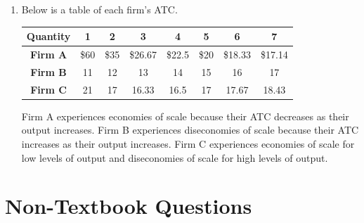 \documentclass{article}
\begin{document}
\begin{enumerate}
\begin{enumerate}
	\end{enumerate}
	
\item Below is a table of each firm's ATC.

	\begin{center}
	\begin{tabular}{| c | c | c | c | c | c | c | c |}
	\hline
	\textbf{Quantity} & 1 & 2 & 3 & 4 & 5 & 6 & 7 \\
	\hline
	\textbf{Firm A} & \$60 & \$35 & \$26.67 & \$22.5 & \$20 & \$18.33 & \$17.14 \\
	\hline
	\textbf{Firm B} & 11 & 12 & 13 & 14 & 15 & 16 & 17 \\
	\hline
	\textbf{Firm C} & 21 & 17 & 16.33 & 16.5 & 17 & 17.67 & 18.43 \\
	\hline
	\end{tabular}
	\end{center}
	
	Firm A experiences economies of scale because their ATC decreases as their output increases. Firm B experiences diseconomies of scale because their ATC increases as their output increases. Firm C experiences economies of scale for low levels of output and diseconomies of scale for high levels of output.

\end{enumerate}

\section*{Non-Textbook Questions}
\end{document}
